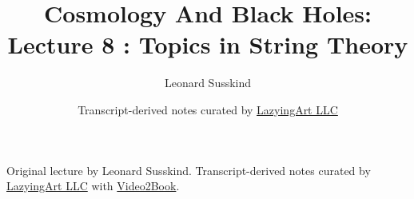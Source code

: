 \documentclass[11pt,oneside]{book}
\begin{document}
\frontmatter
\title{Cosmology And Black Holes: Lecture 8 : Topics in String Theory}
\author{Leonard Susskind}
\date{Transcript-derived notes curated by \href{https://lazying.art}{LazyingArt LLC}}
\maketitle
\begin{center}
\small Original lecture by Leonard Susskind. Transcript-derived notes curated by \href{https://lazying.art}{LazyingArt LLC} with \href{https://github.com/lachlanchen/Video2Book}{Video2Book}.
\end{center}
\clearpage
\mainmatter

\end{document}
